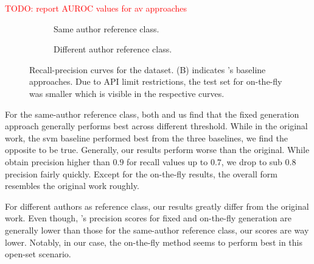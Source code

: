\textcolor{red}{TODO: report AUROC values for av approaches}
\begin{figure}[htbp]
  \centering
  \begin{subfigure}[b]{0.595\textwidth}
    \centering
    
    \caption{Same author reference class. }
    \label{fig:blog_same_author}
  \end{subfigure}
  \hfill
  \begin{subfigure}[b]{0.595\textwidth}
    \centering
    
    \caption{Different author reference class.}
    \label{fig:blog_diff_author}
  \end{subfigure}
  \caption{Recall-precision curves for the \dataBlog{} dataset. 
  (B) indicates \citet{koppel_determining_2014}'s baseline approaches.
  Due to API limit restrictions, the test set for on-the-fly was smaller which is visible in the respective curves.}
  \label{fig:diff_imp_gen_blog}
\end{figure}

For the same-author reference class, both \citet{koppel_determining_2014} and us find that the fixed \imp{} generation approach generally performs best across different threshold.
While in the original work, the \ac{svm} baseline performed best from the three baselines, we find the opposite to be true.
Generally, our results perform worse than the original. 
While \citet{koppel_determining_2014} obtain precision higher than $0.9$ for recall values up to $0.7$, we drop to sub $0.8$ precision fairly quickly.
Except for the on-the-fly results, the overall form resembles the original work roughly.


For different authors as reference class, our results greatly differ from the original work.
Even though, \citet{koppel_determining_2014}'s precision scores for fixed and on-the-fly \imp{} generation are generally lower than those for the same-author reference class, our scores are way lower.
Notably, in our case, the on-the-fly method seems to perform best in this open-set scenario.

